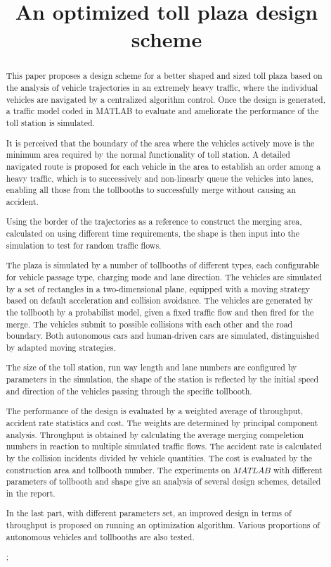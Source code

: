 \documentclass{mcmthesis}
\title{An optimized toll plaza design scheme}
\begin{document}
	
	
\begin{abstract}
	
This paper proposes a design scheme for a better shaped and sized toll plaza based on the analysis of vehicle trajectories in an extremely heavy traffic, where the individual vehicles are navigated by a centralized algorithm control. Once the design is generated, a traffic model coded in MATLAB to evaluate and ameliorate the performance of the toll station is simulated.

It is perceived that the boundary of the area where the vehicles actively move is the minimum area required by the normal functionality of toll station. A detailed navigated route is proposed for each vehicle in the area to establish an order among a heavy traffic, which is to successively and non-linearly queue the vehicles into lanes, enabling all those from the tollbooths to successfully merge without causing an accident. 

Using the border of the trajectories as a reference to construct the merging area, calculated on using different time requirements, the shape is then input into the simulation to test for random traffic flows. 

The plaza is simulated by a number of tollbooths of different types, each configurable for vehicle passage type, charging mode and lane direction. The vehicles are simulated by a set of rectangles in a two-dimensional plane, equipped with a moving strategy based on default acceleration and collision avoidance. The vehicles are generated by the tollbooth by a probabilist model, given a fixed traffic flow and then fired for the merge. The vehicles submit to possible collisions with each other  and the road boundary. Both autonomous cars and human-driven cars are simulated, distinguished by adapted moving strategies.

The size of the toll station, run way length and lane numbers are configured by parameters in the simulation, the shape of the station is reflected by the initial speed and direction of the vehicles passing through the specific tollbooth. 

The performance of the design is evaluated by a weighted average of throughput, accident rate statistics and cost. The weights are determined by principal component analysis. Throughput is obtained by calculating the average merging compeletion numbers in reaction to multiple simulated traffic flows. The accident rate is calculated by the collision incidents divided by vehicle quantities. The cost is evaluated by the construction area and tollbooth number. The experiments on $MATLAB$ with different parameters of tollbooth and shape give an analysis of several design schemes, detailed in the report.

In the last part, with different parameters set, an improved design in terms of throughput is proposed on running an optimization algorithm. Various proportions of autonomous vehicles and tollbooths are also tested.

\begin{keywords}
;
\end{keywords}
\end{abstract}
\end{document}

